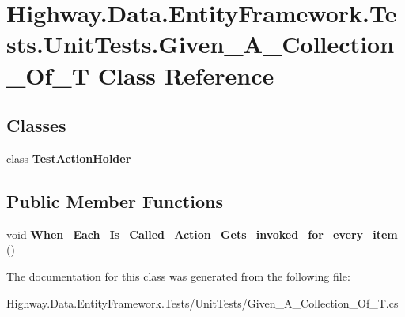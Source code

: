 \hypertarget{class_highway_1_1_data_1_1_entity_framework_1_1_tests_1_1_unit_tests_1_1_given___a___collection___of___t}{\section{Highway.\-Data.\-Entity\-Framework.\-Tests.\-Unit\-Tests.\-Given\-\_\-\-A\-\_\-\-Collection\-\_\-\-Of\-\_\-\-T Class Reference}
\label{class_highway_1_1_data_1_1_entity_framework_1_1_tests_1_1_unit_tests_1_1_given___a___collection___of___t}
}
\subsection*{Classes}
\begin{DoxyCompactItemize}
\item 
class {\bfseries Test\-Action\-Holder}
\end{DoxyCompactItemize}
\subsection*{Public Member Functions}
\begin{DoxyCompactItemize}
\item 
\hypertarget{class_highway_1_1_data_1_1_entity_framework_1_1_tests_1_1_unit_tests_1_1_given___a___collection___of___t_a08595c1c74e20755309e837c66d628ec}{void {\bfseries When\-\_\-\-Each\-\_\-\-Is\-\_\-\-Called\-\_\-\-Action\-\_\-\-Gets\-\_\-invoked\-\_\-for\-\_\-every\-\_\-item} ()}\label{class_highway_1_1_data_1_1_entity_framework_1_1_tests_1_1_unit_tests_1_1_given___a___collection___of___t_a08595c1c74e20755309e837c66d628ec}

\end{DoxyCompactItemize}


The documentation for this class was generated from the following file\-:\begin{DoxyCompactItemize}
\item 
Highway.\-Data.\-Entity\-Framework.\-Tests/\-Unit\-Tests/Given\-\_\-\-A\-\_\-\-Collection\-\_\-\-Of\-\_\-\-T.\-cs\end{DoxyCompactItemize}
